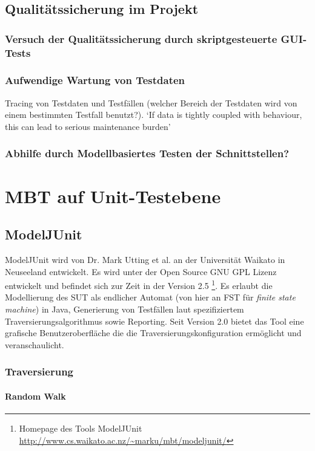\subsection{Qualitätssicherung im Projekt}
\subsubsection{Versuch der Qualitätssicherung durch skriptgesteuerte GUI-Tests}
\subsubsection{Aufwendige Wartung von Testdaten}
Tracing von Testdaten und Testfällen (welcher Bereich der Testdaten wird von einem bestimmten Testfall benutzt?). `If data is tightly coupled with behaviour, this can lead to serious maintenance burden' \cite{baker_model-driven_2005} 
\subsubsection{Abhilfe durch Modellbasiertes Testen der Schnittstellen?}


\section{MBT auf Unit-Testebene}
\subsection{ModelJUnit}
ModelJUnit wird von Dr. Mark Utting et al. an der Universität Waikato in Neuseeland entwickelt. Es wird unter der Open Source GNU GPL Lizenz entwickelt und befindet sich zur Zeit in der Version 2.5 \footnote{Homepage des Tools ModelJUnit \url{http://www.cs.waikato.ac.nz/~marku/mbt/modeljunit/}}. Es erlaubt die Modellierung des SUT als endlicher Automat (von hier an FST für \textit{finite state machine}) in Java, Generierung von Testfällen laut spezifiziertem Traversierungsalgorithmus sowie Reporting. Seit Version 2.0 bietet das Tool eine grafische Benutzeroberfläche die die Traversierungskonfiguration ermöglicht und veranschaulicht.\\
\subsubsection{Traversierung}
\paragraph{Random Walk}
